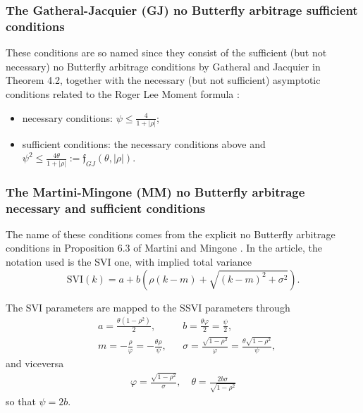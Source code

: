 \documentclass{article}
\providecommand{\tightlist}{%
      \setlength{\itemsep}{0pt}\setlength{\parskip}{0pt}}
\begin{document}
	\hypertarget{the-gatheral-jacquier-gj-no-butterfly-arbitrage-sufficient-conditions}{%
\subsubsection{The Gatheral-Jacquier (GJ) no Butterfly arbitrage
sufficient
conditions}\label{the-gatheral-jacquier-gj-no-butterfly-arbitrage-sufficient-conditions}}

	These conditions are so named since they consist of the sufficient (but
not necessary) no Butterfly arbitrage conditions by Gatheral and
Jacquier \cite{gatheral2014arbitrage} in Theorem 4.2, together with the
necessary (but not sufficient) asymptotic conditions related to the
Roger Lee Moment formula \cite{lee2004moment}:

\begin{itemize}
\tightlist
\item
  necessary conditions: \(\psi\leq\frac{4}{1+|\rho|}\);
\item
  sufficient conditions: the necessary conditions above and
  \(\psi^2\leq \frac{4\theta}{1+|\rho|}:=\mathfrak f_{GJ}(\theta,|\rho|)\).
\end{itemize}

	\hypertarget{the-martini-mingone-mm-no-butterfly-arbitrage-necessary-and-sufficient-conditions}{%
\subsubsection{The Martini-Mingone (MM) no Butterfly arbitrage necessary
and sufficient
conditions}\label{the-martini-mingone-mm-no-butterfly-arbitrage-necessary-and-sufficient-conditions}}

	The name of these conditions comes from the explicit no Butterfly
arbitrage conditions in Proposition 6.3 of Martini and Mingone
\cite{martini2021explicit}. In the article, the notation used is the SVI
one, with implied total variance
\[\text{SVI}(k) = a+b(\rho(k-m)+\sqrt{(k-m)^2+\sigma^2}).\]

The SVI parameters are mapped to the SSVI parameters through
\begin{align*}
&a = \frac{\theta(1-\rho^2)}{2}, & & b=\frac{\theta\varphi}2 = \frac{\psi}2,\\
&m = -\frac{\rho}{\varphi} = -\frac{\theta\rho}{\psi}, & & \sigma=\frac{\sqrt{1-\rho^2}}{\varphi} = \frac{\theta\sqrt{1-\rho^2}}{\psi},
\end{align*} and viceversa \begin{align*}
\varphi = \frac{\sqrt{1-\rho^2}}{\sigma}, \quad \theta=\frac{2b\sigma}{\sqrt{1-\rho^2}}
\end{align*} so that \(\psi = 2b\).
\end{document}
